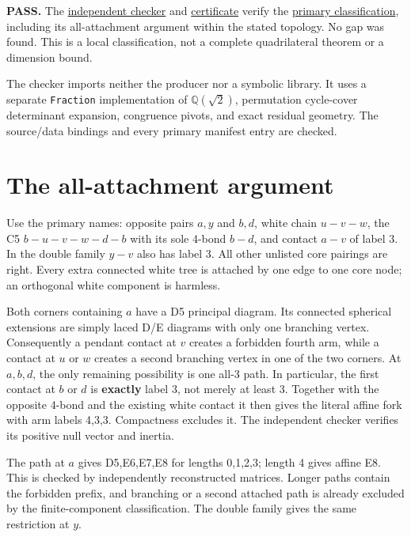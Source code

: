 \documentclass[
  10pt,
]{report}
\begin{document}
\textbf{PASS.} The
\href{../scripts/fresh_sqrt2_dotted_tail_20261015_review.py}{independent
checker} and
\href{fresh_sqrt2_dotted_tail_20261015_review.json}{certificate} verify
the \href{fresh_sqrt2_dotted_tail_20261015.md}{primary classification},
including its all-attachment argument within the stated topology. No gap
was found. This is a local classification, not a complete quadrilateral
theorem or a dimension bound.

The checker imports neither the producer nor a symbolic library. It uses
a separate \texttt{Fraction} implementation of \(\mathbb Q(\sqrt2)\),
permutation cycle-cover determinant expansion, congruence pivots, and
exact residual geometry. The source/data bindings and every primary
manifest entry are checked.

\section{The all-attachment argument}\label{the-all-attachment-argument}

Use the primary names: opposite pairs \(a,y\) and \(b,d\), white chain
\(u-v-w\), the C5 \(b-u-v-w-d-b\) with its sole 4-bond \(b-d\), and
contact \(a-v\) of label 3. In the double family \(y-v\) also has label
3. All other unlisted core pairings are right. Every extra connected
white tree is attached by one edge to one core node; an orthogonal white
component is harmless.

Both corners containing \(a\) have a D5 principal diagram. Its connected
spherical extensions are simply laced D/E diagrams with only one
branching vertex. Consequently a pendant contact at \(v\) creates a
forbidden fourth arm, while a contact at \(u\) or \(w\) creates a second
branching vertex in one of the two corners. At \(a,b,d\), the only
remaining possibility is one all-3 path. In particular, the first
contact at \(b\) or \(d\) is \textbf{exactly} label 3, not merely at
least 3. Together with the opposite 4-bond and the existing white
contact it then gives the literal affine fork with arm labels 4,3,3.
Compactness excludes it. The independent checker verifies its positive
null vector and inertia.

The path at \(a\) gives D5,E6,E7,E8 for lengths 0,1,2,3; length 4 gives
affine E8. This is checked by independently reconstructed matrices.
Longer paths contain the forbidden prefix, and branching or a second
attached path is already excluded by the finite-component
classification. The double family gives the same restriction at \(y\).
\end{document}
